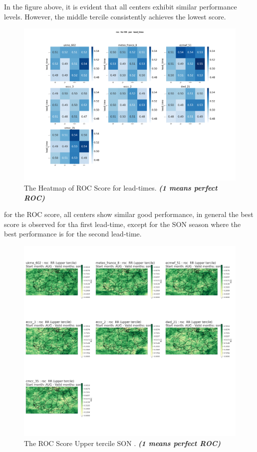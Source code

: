 In the figure above, it is evident that all centers exhibit similar performance levels. However, the middle tercile consistently achieves the lowest score.
\begin{figure}[H]
    \centering
    \includegraphics[scale=0.25]{plots/prob/roc/roc_RR_lead_time.png}
    \caption{The Heatmap of ROC Score for lead-times. \textbf{\textit{(1 means perfect ROC)}}}
\end{figure}

for the ROC score, all centers show similar good performance, in general the best score is observed for tha first lead-time, except for the SON season where the best performance is for the second lead-time.

\begin{figure}[H]
    \centering
    \includegraphics[scale=0.3]{plots/prob/roc/roc_son_RR_upper.png}
    \caption{The ROC Score Upper tercile SON    . \textbf{\textit{(1 means perfect ROC)}}}
\end{figure}

